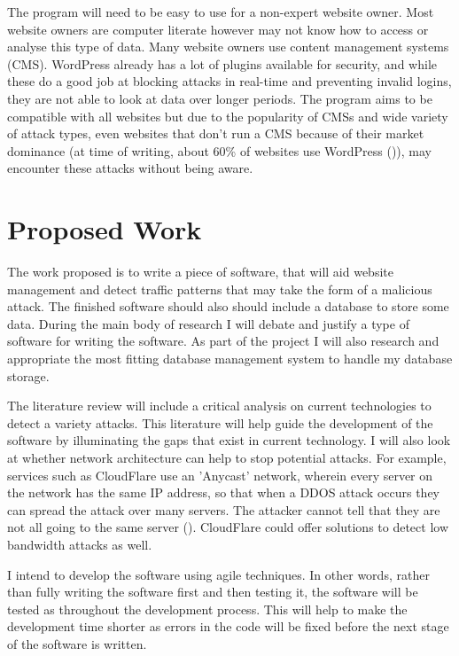The program will need to be easy to use for a non-expert website owner. Most website owners are computer literate however may not know how to access or analyse this type of data. Many website owners use content management systems (CMS). WordPress already has a lot of plugins available for security, and while these do a good job at blocking attacks in real-time and preventing invalid logins, they are not able to look at data over longer periods. The program aims to be compatible with all websites but due to the popularity of CMSs and wide variety of attack types, even websites that don't run a CMS  because of their market dominance (at time of writing, about 60\% of websites use WordPress (\cite{IsItWP})), may encounter these attacks without being aware.

\section{Proposed Work}
\label{proposed}
The work proposed is to write a piece of software, that will aid website management and detect traffic patterns that may take the form of a malicious attack. The finished software should also should include a database to store some data. During the main body of research I will debate and justify a type of software for writing the software. As part of the project I will also research and appropriate the most fitting database management system to handle my database storage. 

The literature review will include a critical analysis on current technologies to detect a variety attacks. This literature will help guide the development of the software by illuminating the gaps that exist in current technology. I will also look at whether network architecture can help to stop potential attacks. For example, services such as CloudFlare use an 'Anycast' network, wherein every server on the network has the same IP address, so that when a DDOS attack occurs they can spread the attack over many servers. The attacker cannot tell that they are not all going to the same server (\cite{CloudFlare}). CloudFlare could offer solutions to detect low bandwidth attacks as well.

I intend to develop the software using agile techniques. In other words, rather than fully writing the software first and then testing it, the software will be tested as throughout the development process. This will help to make the development time shorter as errors in the code will be fixed before the next stage of the software is written. 

